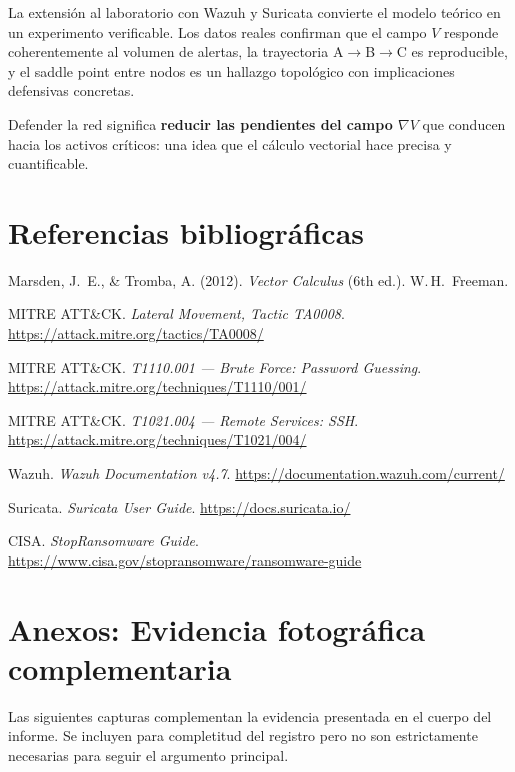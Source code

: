 \documentclass[12pt,a4paper]{article}
\newcommand{\grad}{\nabla}
\begin{document}
La extensión al laboratorio con Wazuh y Suricata convierte el modelo
teórico en un experimento verificable. Los datos reales confirman que
el campo $V$ responde coherentemente al volumen de alertas, la trayectoria
A$\to$B$\to$C es reproducible, y el saddle point entre nodos es un
hallazgo topológico con implicaciones defensivas concretas.

Defender la red significa \textbf{reducir las pendientes del campo
$\grad V$} que conducen hacia los activos críticos: una idea que el
cálculo vectorial hace precisa y cuantificable.

\section{Referencias bibliográficas}

\begin{enumerate}[label={[\arabic*]}]
  \item Marsden, J.~E., \& Tromba, A. (2012). \textit{Vector Calculus}
    (6th ed.). W.\,H.\ Freeman.
  \item MITRE ATT\&CK. \textit{Lateral Movement, Tactic TA0008}.
    \url{https://attack.mitre.org/tactics/TA0008/}
  \item MITRE ATT\&CK. \textit{T1110.001 --- Brute Force: Password Guessing}.
    \url{https://attack.mitre.org/techniques/T1110/001/}
  \item MITRE ATT\&CK. \textit{T1021.004 --- Remote Services: SSH}.
    \url{https://attack.mitre.org/techniques/T1021/004/}
  \item Wazuh. \textit{Wazuh Documentation v4.7}.
    \url{https://documentation.wazuh.com/current/}
  \item Suricata. \textit{Suricata User Guide}.
    \url{https://docs.suricata.io/}
  \item CISA. \textit{StopRansomware Guide}.
    \url{https://www.cisa.gov/stopransomware/ransomware-guide}
\end{enumerate}

\newpage
\section*{Anexos: Evidencia fotográfica complementaria}

Las siguientes capturas complementan la evidencia presentada en el
cuerpo del informe. Se incluyen para completitud del registro pero
no son estrictamente necesarias para seguir el argumento principal.
\end{document}
